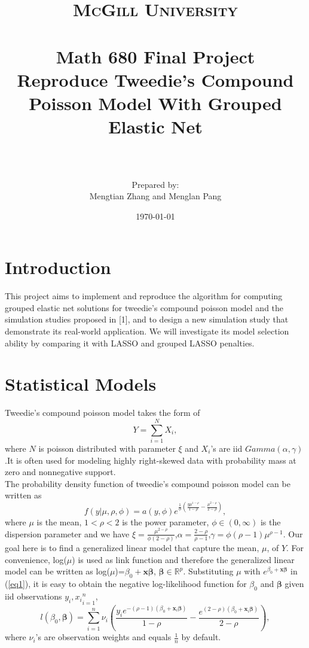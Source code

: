 \documentclass[paper=a4, fontsize=11pt]{scrartcl} %
\title{	
\normalfont \normalsize 
\textsc{McGill University} \\ [25pt] %
\horrule{0.5pt} \\[0.4cm] %
\huge Math 680 Final Project \\[1cm] Reproduce Tweedie’s Compound Poisson Model With Grouped Elastic Net\\ %
\horrule{2pt} \\[0.5cm] %
\author{Prepared by: \\ Mengtian Zhang and Menglan Pang} %
}
\date{\normalsize\today} %
\begin{document}
\maketitle %

\thispagestyle{empty}
\newpage
\clearpage
\setcounter{page}{1}
\renewcommand{\thefootnote}{\fnsymbol{footnote}}
\setcounter{footnote}{0}
\section*{\textbf{Introduction}}
This project aims to implement and reproduce the algorithm for computing grouped elastic net solutions for tweedie's compound poisson model and the simulation studies proposed in [1], and to design a new simulation study that demonstrate its real-world application. We will investigate its model selection ability by comparing it with LASSO and grouped LASSO penalties.\\


\section*{\textbf{Statistical Models}}
Tweedie's compound poisson model takes the form of
\begin{equation*}
Y=\sum_{i=1}^{N}X_{i},
\end{equation*}
where $N$ is poisson distributed with parameter $\xi$ and $X_{i}$'s are iid $Gamma(\alpha,\gamma)$.It is often used for modeling highly right-skewed data with probability mass at zero and nonnegative support.\\

The probability density function of tweedie's compound poisson model can be written as
\begin{equation}\label{eq1}
f(y|\mu,\rho,\phi)=a(y,\phi)e^{\frac{1}{\phi}(\frac{y\mu^{1-\rho}}{1-\rho}-\frac{\mu^{2-\rho}}{2-\rho})},
\end{equation}
where $\mu$ is the mean, $1<\rho<2$ is the power parameter, $\phi\in (0,\infty)$ is the dispersion parameter and we have $\xi=\frac{\mu^{2-\rho}}{\phi(2-\rho)}$,$\alpha=\frac{2-\rho}{\rho-1}$,$\gamma=\phi(\rho-1)\mu^{\rho-1}$. Our goal here is to find a generalized linear model that capture the mean, $\mu$, of $Y$. For convenience, log($\mu$) is used as link function and therefore the generalized linear model can be written as log($\mu$)=$\beta_{0}+\boldsymbol{x}\boldsymbol{\beta}$, $\boldsymbol{\beta}\in \mathbb{R}^{p}$. Substituting  $\mu$ with $e^{\beta_{0}+\boldsymbol{x}\boldsymbol{\beta}}$ in (\ref{eq1}), it is easy to obtain the negative log-likelihood function for $\beta_{0}$ and $\boldsymbol{\beta}$ given iid observations ${y_{i},x_{i}}_{i=1}^{n}$,
\begin{equation}\label{loglike}
l(\beta_{0},\boldsymbol{\beta})=\sum_{i=1}^{n}\nu_{i}(\frac{y_{i}e^{-(\rho-1)(\beta_{0}+\boldsymbol{x}_{i}\boldsymbol{\beta})}}{1-\rho}-\frac{e^{(2-\rho)(\beta_{0}+\boldsymbol{x}_{i}\boldsymbol{\beta})}}{2-\rho}),
\end{equation}
where $\nu_{i}$'s are observation weights and equals $\frac{1}{n}$ by default. \\
\end{document}
